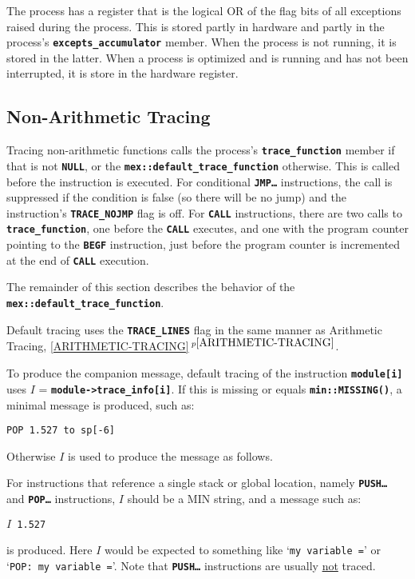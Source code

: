 \documentclass[12pt]{article}
\newcommand{\TT}[1]{{\tt \bfseries #1}}
\newcommand{\itemref}[1]{\ref{#1}$\,^{p\pageref{#1}}$}
\newcommand{\EOL}{\penalty \exhyphenpenalty}
\begin{document}
The process has a register that is the logical OR of the flag bits
of all exceptions
raised during the process.  This is stored partly in hardware
and partly in the process's \TT{excepts\_\EOL accumulator} member.
When the process is not running, it is stored in the latter.  When
a process is optimized and is running and has not been interrupted,
it is store in the hardware register.

\subsection{Non-Arithmetic Tracing}
\label{NON-ARITHMETIC-TRACING}

Tracing non-arithmetic functions calls the process's
\TT{trace\_function} member if that is not \TT{NULL},
or the \TT{mex::\EOL default\_\EOL trace\_\EOL function}
otherwise.  This is called before the instruction is
executed.  For conditional \TT{JMP\ldots} instructions,
the call is suppressed if the condition is false (so there
will be no jump) and the instruction's \TT{TRACE\_NOJMP}
flag is off.  For \TT{CALL} instructions, there are two
calls to \TT{trace\_function}, one before the \TT{CALL}
executes, and one with the program counter pointing
to the \TT{BEGF} instruction, just before the program
counter is incremented at the end of \TT{CALL} execution.

The remainder of this section describes the behavior of
the \TT{mex::\EOL default\_\EOL trace\_\EOL function}.

Default tracing uses the \TT{TRACE\_LINES} flag in the
same manner as Arithmetic Tracing, \itemref{ARITHMETIC-TRACING}.

To produce the companion message,
default tracing of the instruction \TT{module[i]} uses
$I$ = \TT{module->trace\_info[i]}.  If this is missing
or equals \TT{min::MISSING()}, a minimal message
is produced, such as:
\begin{center}
\tt POP 1.527 to sp[-6]
\end{center}
Otherwise $I$ is used to produce the message as follows.

For instructions that reference a single stack or global location,
namely \TT{PUSH\ldots} and \TT{POP\ldots} instructions,
$I$ should be a MIN string, and a message such
as:
\begin{center}
\tt $I$ 1.527
\end{center}
is produced.  Here $I$ would be expected to something
like `{\tt my variable =}' or `{\tt POP: my variable =}'.
Note that \TT{PUSH\ldots} instructions are usually
\underline{not} traced.
\end{document}
